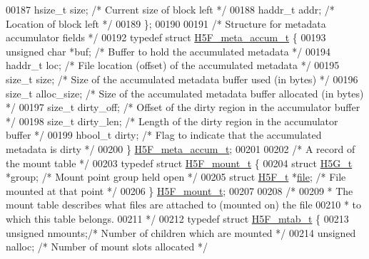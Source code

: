 \begin{DoxyCode}
00187     hsize\_t             size;           \textcolor{comment}{/* Current size of block left */}
00188     haddr\_t             addr;           \textcolor{comment}{/* Location of block left */}
00189 \};
00190 
00191 \textcolor{comment}{/* Structure for metadata accumulator fields */}
00192 \textcolor{keyword}{typedef} \textcolor{keyword}{struct }\hyperlink{struct_h5_f__meta__accum__t}{H5F\_meta\_accum\_t} \{
00193     \textcolor{keywordtype}{unsigned} \textcolor{keywordtype}{char}      *buf;            \textcolor{comment}{/* Buffer to hold the accumulated metadata */}
00194     haddr\_t             loc;            \textcolor{comment}{/* File location (offset) of the accumulated metadata */}
00195     \textcolor{keywordtype}{size\_t}              size;           \textcolor{comment}{/* Size of the accumulated metadata buffer used (in bytes) */}
00196     \textcolor{keywordtype}{size\_t}              alloc\_size;     \textcolor{comment}{/* Size of the accumulated metadata buffer allocated (in bytes) */}
00197     \textcolor{keywordtype}{size\_t}              dirty\_off;      \textcolor{comment}{/* Offset of the dirty region in the accumulator buffer */}
00198     \textcolor{keywordtype}{size\_t}              dirty\_len;      \textcolor{comment}{/* Length of the dirty region in the accumulator buffer */}
00199     hbool\_t             dirty;          \textcolor{comment}{/* Flag to indicate that the accumulated metadata is dirty */}
00200 \} \hyperlink{struct_h5_f__meta__accum__t}{H5F\_meta\_accum\_t};
00201 
00202 \textcolor{comment}{/* A record of the mount table */}
00203 \textcolor{keyword}{typedef} \textcolor{keyword}{struct }\hyperlink{struct_h5_f__mount__t}{H5F\_mount\_t} \{
00204     \textcolor{keyword}{struct }\hyperlink{struct_h5_g__t}{H5G\_t}   *group; \textcolor{comment}{/* Mount point group held open      */}
00205     \textcolor{keyword}{struct }\hyperlink{struct_h5_f__t}{H5F\_t}   *\hyperlink{structfile}{file};  \textcolor{comment}{/* File mounted at that point       */}
00206 \} \hyperlink{struct_h5_f__mount__t}{H5F\_mount\_t};
00207 
00208 \textcolor{comment}{/*}
00209 \textcolor{comment}{ * The mount table describes what files are attached to (mounted on) the file}
00210 \textcolor{comment}{ * to which this table belongs.}
00211 \textcolor{comment}{ */}
00212 \textcolor{keyword}{typedef} \textcolor{keyword}{struct }\hyperlink{struct_h5_f__mtab__t}{H5F\_mtab\_t} \{
00213     \textcolor{keywordtype}{unsigned}        nmounts;\textcolor{comment}{/* Number of children which are mounted */}
00214     \textcolor{keywordtype}{unsigned}        nalloc; \textcolor{comment}{/* Number of mount slots allocated  */}

\end{DoxyCode}
